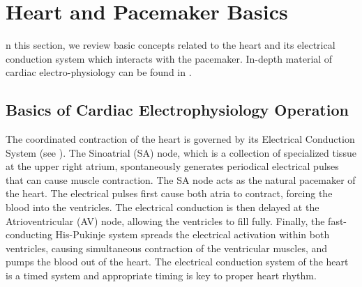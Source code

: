 \section{Heart and Pacemaker Basics}
\label{basics}
n this section, we review basic concepts related to the heart and its electrical conduction system which interacts with the pacemaker. In-depth material of cardiac electro-physiology can be found in \cite{fogoros}. 

\subsection{Basics of Cardiac Electrophysiology Operation}
The coordinated contraction of the heart is governed by its Electrical Conduction System (see ). The Sinoatrial (SA) node, which is a collection of specialized tissue at the upper right atrium, spontaneously generates periodical electrical pulses that can cause muscle contraction. The SA node acts as the natural pacemaker of the heart. The electrical pulses first cause both atria to contract, forcing the blood into the ventricles. 
The electrical conduction is then delayed at the Atrioventricular (AV) node, allowing the ventricles to fill fully. Finally, the fast-conducting His-Pukinje system spreads the electrical activation within both ventricles, causing simultaneous contraction of the ventricular muscles, and pumps the blood out of the heart. The electrical conduction system of the heart is a timed system and appropriate timing is key to proper heart rhythm.

